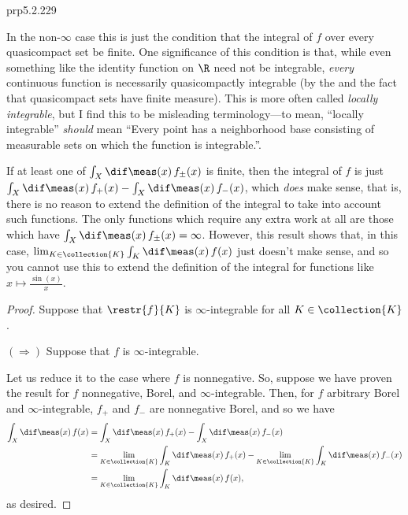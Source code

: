 \begin{thm}{}{prp5.2.229}
\begin{rmk}
In the non-$\infty$ case this is just the condition that the integral of $f$ over every quasicompact set be finite.  One significance of this condition is that, while even something like the identity function on $\R$ need not be integrable, \emph{every} continuous function is necessarily quasicompactly integrable (by the  and the fact that quasicompact sets have finite measure).  This is more often called \emph{locally integrable}, but I find this to be misleading terminology---to mean, ``locally integrable'' \emph{should} mean ``Every point has a neighborhood base consisting of measurable sets on which the function is integrable.''.
\end{rmk}
\begin{rmk}
If at least one of $\int _X\dif \meas (x)\, f_{\pm}(x)$ is finite, then the integral of $f$ is just $\int _X\dif \meas (x)\, f_+(x)-\int _X\dif \meas (x)\, f_-(x)$, which \emph{does} make sense, that is, there is no reason to extend the definition of the integral to take into account such functions.  The only functions which require any extra work at all are those which have $\int _X\dif \meas (x)\, f_{\pm}(x)=\infty$.  However, this result shows that, in this case, $\lim _{K\in \collection{K}}\int _K\dif \meas (x)\, f(x)$ just doesn't make sense, and so you cannot use this to extend the definition of the integral for functions like $x\mapsto \frac{\sin (x)}{x}$.
\end{rmk}
\begin{proof}
Suppose that $\restr{f}{K}$ is $\infty$-integrable for all $K\in \collection{K}$.

\blankline
\noindent
$(\Rightarrow )$ Suppose that $f$ is $\infty$-integrable.

Let us reduce it to the case where $f$ is nonnegative.  So, suppose we have proven the result for $f$ nonnegative, Borel, and $\infty$-integrable.  Then, for $f$ arbitrary Borel and $\infty$-integrable, $f_+$ and $f_-$ are nonnegative Borel, and so we have
\begin{equation}
\begin{split}
\int _X\dif \meas (x)\, f(x) & =\int _X\dif \meas (x)\, f_+(x)-\int _X\dif \meas (x)\, f_-(x) \\
& =\lim _{K\in \collection{K}}\int _K\dif \meas (x)\, f_+(x)-\lim _{K\in \collection{K}}\int _K\dif \meas (x)\, f_-(x) \\
& =\lim _{K\in \collection{K}}\int _K\dif \meas (x)\, f(x),
\end{split}
\end{equation}
as desired.


\end{proof}
\end{thm}
